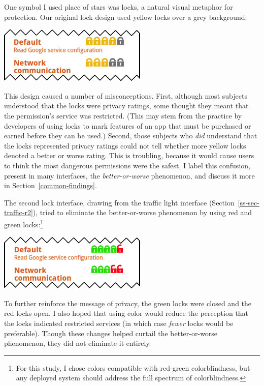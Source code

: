 \documentclass[11pt]{article}
\newcommand{\refsec}[1]{Section~\ref{#1}}
\begin{document}
One symbol I used place of stars was locks, a natural visual metaphor for protection.
Our original lock design used yellow locks over a grey background:
\label{ss-sec-locks-r1}
\begin{center}
\includegraphics[width=.5\linewidth]{candidate-img/locks/locksR1.png}
\end{center}
This design caused a number of
misconceptions.
First, although most subjects understood that the locks were privacy 
ratings, some thought they meant that 
the permission's service was restricted. (This may 
stem from the practice by developers of using locks to mark features of 
an app that must be purchased or earned before they can be used.)
Second, those subjects who \emph{did} understand that the locks represented privacy ratings
could not tell whether more yellow locks denoted a better or worse 
rating. This is troubling, because it would cause users to think the most 
dangerous permissions were the safest. I label this confusion,
present in many interfaces, the 
\emph{better-or-worse} phenomenon, and discuss it more in \refsec{common-findings}.

The second lock interface, drawing from the traffic light interface
(\refsec{ss-sec-traffic-r2}), tried to eliminate the better-or-worse 
phenomenon by using red and green locks:\footnote{For this 
  study, I chose colors
  compatible with red-green colorblindness, but any deployed system
  should address the full spectrum of colorblindness.}
\label{ss-sec-locks-r2}
\begin{center}
\includegraphics[width=.5\linewidth]{candidate-img/locks/locksR2.png}
\end{center}
To further reinforce the message of privacy, the 
green locks were closed and the red locks open.
I also hoped that using color would reduce 
the perception that the locks indicated restricted services (in which 
case \emph{fewer} locks would be preferable).
Though these changes helped curtail the better-or-worse phenomenon, they did not 
eliminate it entirely. 
\end{document}
